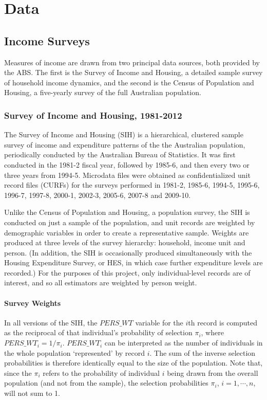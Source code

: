 \chapter{Data}

\section{Income Surveys}

Measures of income are drawn from two principal data sources, both provided by the ABS. The first is the Survey of Income and Housing, a detailed sample survey of household income dynamics, and the second is the Census of Population and Housing, a five-yearly survey of the full Australian population. 

\subsection{Survey of Income and Housing, 1981-2012}

The Survey of Income and Housing (SIH) is a hierarchical, clustered sample survey of income and expenditure patterns of the the Australian population, periodically conducted by the Australian Bureau of Statistics. It was first conducted in the 1981-2 fiscal year, followed by 1985-6, and then every two or three years from 1994-5. Microdata files were obtained as confidentialized unit record files (CURFs) for the surveys performed in 1981-2, 1985-6, 1994-5, 1995-6, 1996-7, 1997-8, 2000-1, 2002-3, 2005-6, 2007-8 and 2009-10.

Unlike the Census of Population and Housing, a population survey, the SIH is conducted on just a sample of the population, and unit records are weighted by demographic variables in order to create a representative sample. Weights are produced at three levels of the survey hierarchy: household, income unit and person. (In addition, the SIH is occasionally produced simultaneously with the Housing Expenditure Survey, or HES, in which case further expenditure levels are recorded.) For the purposes of this project, only individual-level records are of interest, and so all estimators are weighted by person weight.

\subsubsection{Survey Weights}

In all versions of the SIH, the $PERS\_WT$ variable for the $i$th record is computed as the reciprocal of that individual's probability of selection $\pi_i$, where $PERS\_WT_i = 1/\pi_i.$ $PERS\_WT_i$ can be interpreted as the number of individuals in the whole population `represented' by record $i$. The sum of the inverse selection probabilities is therefore identically equal to the size of the population. Note that, since the $\pi_i$ refers to the probability of individual $i$ being drawn from the overall population (and not from the sample), the selection probabilities $\pi_i$, $i=1,\cdots,n$, will not sum to 1.




